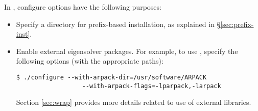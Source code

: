 In \slepc, configure options have the following purposes:
\begin{itemize}
\item Specify a directory for prefix-based installation, as explained in \S\ref{sec:prefix-inst}.
\item Enable external eigensolver packages. For example, to use \arpack, specify the following options (with the appropriate paths):
	\begin{Verbatim}[fontsize=\small]
	$ ./configure --with-arpack-dir=/usr/software/ARPACK 
	              --with-arpack-flags=-lparpack,-larpack
	\end{Verbatim}
Section \ref{sec:wrap} provides more details related to use of external libraries.
\end{itemize}

